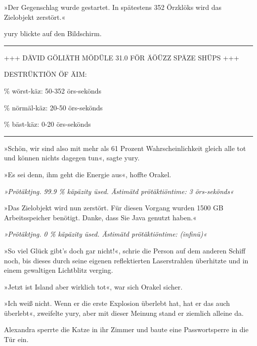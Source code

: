 »Der Gegenschlag wurde gestartet. In spätestens 352 Örzklöks wird das Zielobjekt zerstört.«

yury blickte auf den Bildschirm.

\noindent \parbox{\textwidth}{ \vspace{3ex} \hrule \vspace{3ex}

    \begin{footnotesize}
    \begin{ttfamily}

\noindent +++ DÄVID GÖLIÄTH MÖDÜLE 31.0 FÖR ÄÖÜZZ SPÄZE SHÜPS +++

\noindent DESTRÜKTIÖN ÖF ÄIM:

 \% wörst-käz: 50-352 örs-sekönds

 \% nörmäl-käz: 20-50 örs-sekönds

 \% bäst-käz: 0-20 örs-sekönds

    \end{ttfamily}
    \end{footnotesize}

\vspace{3ex} \hrule \vspace{3ex} }

»Schön, wir sind also mit mehr als 61 Prozent Wahrscheinlichkeit gleich alle tot und können nichts dagegen tun«, sagte yury.

»Es sei denn, ihm geht die Energie aus«, hoffte Orakel.

\textit{»Prötäktjng. 99.9 \% käpäzity üsed. Ästimätd prötäktiöntime: 3 örs-sekönds«}

»Das Zielobjekt wird nun zerstört. Für diesen Vorgang wurden 1500 GB Arbeitsspeicher benötigt. Danke, dass Sie Java genutzt haben.«

\textit{»Prötäktjng. 0 \% käpäzity üsed. Ästimätd prötäktiöntime: (infinü)«}

»So viel Glück gibt’s doch gar nicht!«, schrie die Person auf dem anderen Schiff noch, bis dieses durch seine eigenen reflektierten Laserstrahlen überhitzte und in einem gewaltigen Lichtblitz verging.

»Jetzt ist Island aber wirklich tot«, war sich Orakel sicher.

»Ich weiß nicht. Wenn er die erste Explosion überlebt hat, hat er das auch überlebt«, zweifelte yury, aber mit dieser Meinung stand er ziemlich alleine da.

Alexandra sperrte die Katze in ihr Zimmer und baute eine Passwortsperre in die Tür ein.

